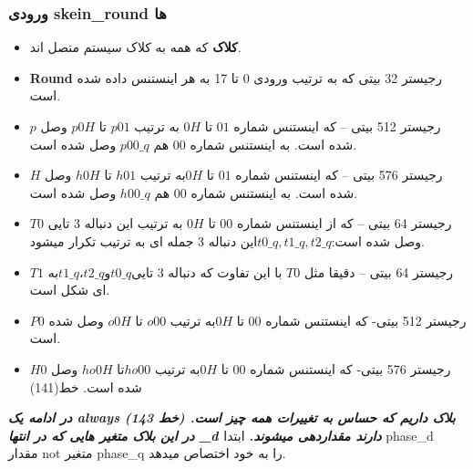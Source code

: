 \subsubsection{
	ورودی skein\_round ها
}
\begin{itemize}
	\item
	      \textbf{کلاک}
	      که همه به کلاک سیستم متصل اند.
	\item
	      \textbf{Round}
	      رجیستر 32 بیتی که به ترتیب ورودی 0 تا 17 به هر اینستنس داده شده است.
	\item
	      \textbf{$p$}
	      رجیستر 512 بیتی – که اینستنس شماره $01$ تا $0H$ به ترتیب $p01$ تا $p0H$ وصل شده است. به اینستنس شماره $00$ هم $p00\_q$ وصل شده است.
	\item
	      \textbf{$H$}
	      رجیستر 576 بیتی – که اینستنس شماره $01$ تا $0H $به ترتیب $h01$ تا $h0H$ وصل شده است. به اینستنس شماره $00$ هم $h00\_q$ وصل شده است.
	\item
	      \textbf{$T0$}
	      رجیستر 64 بیتی –   که از اینستنس شماره $00$ تا $0H$ به ترتیب این دنباله 3 تایی وصل شده است:$ t0\_q, t1\_q , t2\_q $این دنباله 3 جمله ای به ترتیب تکرار میشود.
	\item
	      \textbf{$T1$}
	      رجیستر 64 بیتی – دقیقا مثل $T0$ با این تفاوت که دنباله 3 تایی$ t1\_q ، t2\_q و t0\_q $به ای شکل است.
	\item
	      \textbf{$P0$}
	      رجیستر 512 بیتی- که اینستنس شماره $00$ تا $0H$به ترتیب $o00$ تا $o0H$ وصل شده است. 
	\item
	      \textbf{$H0$}
	      رجیستر 576 بیتی- که اینستنس شماره $00$ تا $0H $به ترتیب $ho00 $تا $ho0H$ وصل شده است. خط(141)
	      
\end{itemize}
\textit{\textbf{
	در ادامه یک always بلاک داریم که حساس به تغییرات همه چیز است. (خط 143)
	در این بلاک متغیر هایی که در انتها
	\_d
دارند مقداردهی میشوند.}}
ابتدا phase\_d مقدار not متغیر phase\_q را به خود اختصاص میدهد.
